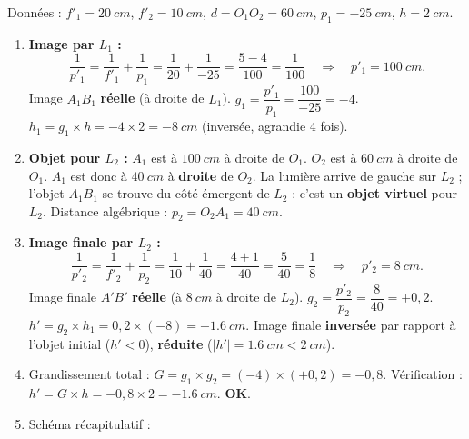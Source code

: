 \documentclass[11pt]{article}
\begin{document}
\begin{corrige}
Données : $f'_1 = \SI{20}{cm}$, $f'_2 = \SI{10}{cm}$, $d = O_1O_2 = \SI{60}{cm}$, $p_1 = \SI{-25}{cm}$, $h = \SI{2}{cm}$.
\begin{enumerate}
    \item \textbf{Image par $L_1$ :}
    \[ \frac{1}{p'_1} = \frac{1}{f'_1} + \frac{1}{p_1} = \frac{1}{20} + \frac{1}{-25} = \frac{5-4}{100} = \frac{1}{100} \quad\Rightarrow\quad p'_1 = \SI{+100}{cm}. \]
    Image $A_1B_1$ \textbf{réelle} (à droite de $L_1$).
    $g_1 = \dfrac{p'_1}{p_1} = \dfrac{100}{-25} = -4$.
    $h_1 = g_1 \times h = -4 \times 2 = \SI{-8}{cm}$ (inversée, agrandie 4 fois).
    \item \textbf{Objet pour $L_2$ :} $A_1$ est à $\SI{100}{cm}$ à droite de $O_1$. $O_2$ est à $\SI{60}{cm}$ à droite de $O_1$.
    $A_1$ est donc à $\SI{40}{cm}$ à \textbf{droite} de $O_2$.
    La lumière arrive de gauche sur $L_2$ ; l'objet $A_1B_1$ se trouve du côté émergent de $L_2$ : c'est un \textbf{objet virtuel} pour $L_2$.
    Distance algébrique : $p_2 = \overline{O_2A_1} = \SI{+40}{cm}$.
    \item \textbf{Image finale par $L_2$ :}
    \[ \frac{1}{p'_2} = \frac{1}{f'_2} + \frac{1}{p_2} = \frac{1}{10} + \frac{1}{40} = \frac{4+1}{40} = \frac{5}{40} = \frac{1}{8} \quad\Rightarrow\quad p'_2 = \SI{+8}{cm}. \]
    Image finale $A'B'$ \textbf{réelle} (à $\SI{8}{cm}$ à droite de $L_2$).
    $g_2 = \dfrac{p'_2}{p_2} = \dfrac{8}{40} = +0,2$.
    $h' = g_2 \times h_1 = 0,2 \times (-8) = \SI{-1,6}{cm}$.
    Image finale \textbf{inversée} par rapport à l'objet initial ($h'<0$), \textbf{réduite} ($|h'|=\SI{1,6}{cm} < \SI{2}{cm}$).
    \item Grandissement total : $G = g_1 \times g_2 = (-4) \times (+0,2) = -0,8$.
    Vérification : $h' = G \times h = -0,8 \times 2 = \SI{-1,6}{cm}$. \textbf{OK}.
    \item Schéma récapitulatif :
    \begin{popfigure}
\end{popfigure}
\end{enumerate}
\end{corrige}
\end{document}

